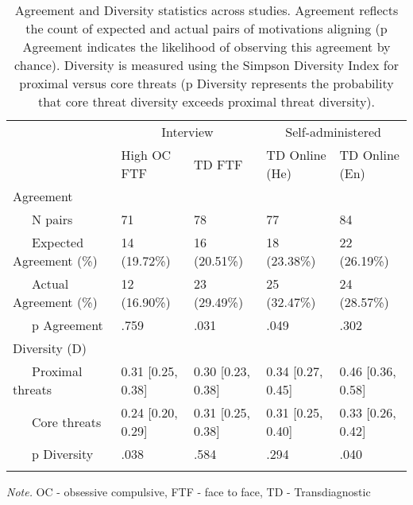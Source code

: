 \documentclass[
  man,floatsintext]{apa7}
\begin{document}
\begin{table}[tbp]

\begin{center}
\begin{threeparttable}

\caption{\label{tab:agreement}Agreement and Diversity statistics across studies. Agreement reflects the count of expected and actual pairs of motivations aligning (p Agreement indicates the likelihood of observing this agreement by chance). Diversity is measured using the Simpson Diversity Index for proximal versus core threats (p Diversity represents the probability that core threat diversity exceeds proximal threat diversity).}

\begin{tabular}{lllll}
\toprule
 & \multicolumn{2}{c}{Interview} & \multicolumn{2}{c}{Self-administered} \\
\cmidrule(r){2-3} \cmidrule(r){4-5}
 & High OC FTF & TD FTF & TD Online (He) & TD Online (En)\\
\midrule
Agreement &  &  &  & \\
\ \ \ N pairs & 71 & 78 & 77 & 84\\
\ \ \ Expected Agreement (\%) & 14 (19.72\%) & 16 (20.51\%) & 18 (23.38\%) & 22 (26.19\%)\\
\ \ \ Actual Agreement (\%) & 12 (16.90\%) & 23 (29.49\%) & 25 (32.47\%) & 24 (28.57\%)\\
\ \ \ p Agreement & .759 & .031 & .049 & .302\\
Diversity (D) &  &  &  & \\
\ \ \ Proximal threats & 0.31 [0.25, 0.38] & 0.30 [0.23, 0.38] & 0.34 [0.27, 0.45] & 0.46 [0.36, 0.58]\\
\ \ \ Core threats & 0.24 [0.20, 0.29] & 0.31 [0.25, 0.38] & 0.31 [0.25, 0.40] & 0.33 [0.26, 0.42]\\
\ \ \ p Diversity & .038 & .584 & .294 & .040\\
\bottomrule
\addlinespace
\end{tabular}

\begin{tablenotes}[para]
\normalsize{\textit{Note.} OC - obsessive compulsive, FTF - face to face, TD - Transdiagnostic}
\end{tablenotes}

\end{threeparttable}
\end{center}

\end{table}
\end{document}
